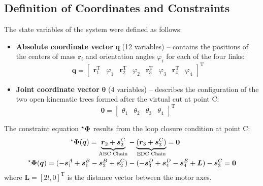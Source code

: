 \subsection{Definition of Coordinates and Constraints}
The state variables of the system were defined as follows:
\begin{itemize}
    \item \textbf{Absolute coordinate vector} $\boldsymbol{q}$ (12 variables) -- contains the positions of the centers of mass $\boldsymbol{r}_i$ and orientation angles $\varphi_i$ for each of the four links:
    \begin{equation}
        \label{eq:vector_c}
        \boldsymbol{q} =\begin{bmatrix}
            \boldsymbol{r}_1^\mathrm{T} & \varphi_1 & \boldsymbol{r}_2^\mathrm{T} & \varphi_2 & \boldsymbol{r}_3^\mathrm{T} & \varphi_3 & \boldsymbol{r}_4^\mathrm{T} & \varphi_4
        \end{bmatrix}^\mathrm{T}
    \end{equation}
    \item \textbf{Joint coordinate vector} $\boldsymbol{\theta}$ (4 variables) -- describes the configuration of the two open kinematic trees formed after the virtual cut at point C:
    \begin{equation}
        \label{eq:vector_theta}
        \boldsymbol{\theta} = \begin{bmatrix}
            \theta_1 & \theta_2 & \theta_3 & \theta_4
        \end{bmatrix}^\mathrm{T}
    \end{equation}
\end{itemize}

The constraint equation $\prescript{\star}{}{}\boldsymbol{\Phi}$ results from the loop closure condition at point C:
\begin{equation}
    \label{eq:Phi}
    \begin{aligned}
        \prescript{\star}{}{}\boldsymbol{\Phi}(\boldsymbol{q}) = \underbrace{\boldsymbol{r}_2 + \boldsymbol{s}_2^C}_{\text{ABC Chain}} &- \underbrace{(\boldsymbol{r}_3 + \boldsymbol{s}_3^C)}_{\text{EDC Chain}} = \boldsymbol{0} \\
        \prescript{\star}{}{}\boldsymbol{\Phi}(\boldsymbol{q}) = (-\boldsymbol{s}_1^A + \boldsymbol{s}_1^B - \boldsymbol{s}_2^B + \boldsymbol{s}_2^C) &- (-\boldsymbol{s}_3^D + \boldsymbol{s}_4^D - \boldsymbol{s}_4^E + \boldsymbol{L}) - \boldsymbol{s}_3^C = \boldsymbol{0}
    \end{aligned}
\end{equation}
where $\boldsymbol{L} = [2l, 0]^\mathrm{T}$ is the distance vector between the motor axes.

